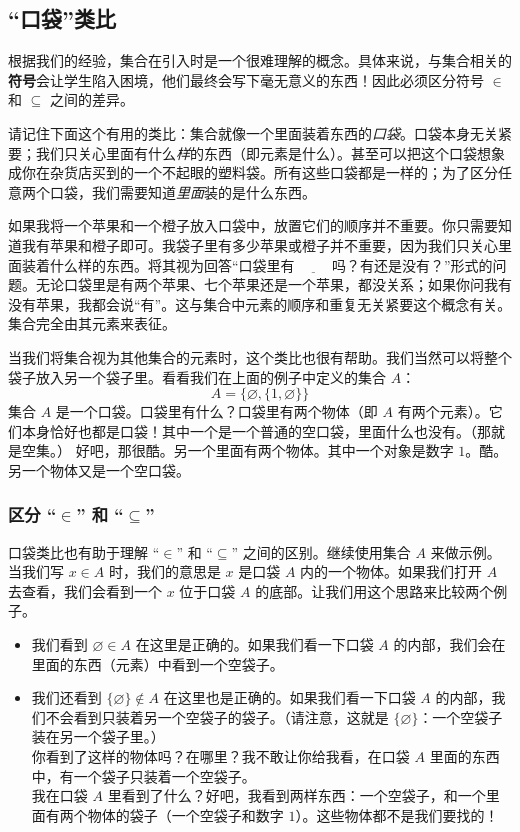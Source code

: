 \subsection{``口袋''类比}\label{sec:section3.4.4}

根据我们的经验，集合在引入时是一个很难理解的概念。具体来说，与集合相关的\textbf{符号}会让学生陷入困境，他们最终会写下毫无意义的东西！因此必须区分符号 $\in$ 和 $\subseteq$ 之间的差异。

请记住下面这个有用的类比：集合就像一个里面装着东西的\textit{口袋}。口袋本身无关紧要；我们只关心里面有什么\textit{样}的东西（即元素是什么）。甚至可以把这个口袋想象成你在杂货店买到的一个不起眼的塑料袋。所有这些口袋都是一样的；为了区分任意两个口袋，我们需要知道\textit{里面}装的是什么东西。

如果我将一个苹果和一个橙子放入口袋中，放置它们的顺序并不重要。你只需要知道我有苹果和橙子即可。我袋子里有多少苹果或橙子并不重要，因为我们只关心里面装着什么样的东西。将其视为回答``口袋里有 $\underline{\qquad}$ 吗？有还是没有？''形式的问题。无论口袋里是有两个苹果、七个苹果还是一个苹果，都没关系；如果你问我有没有苹果，我都会说``有''。这与集合中元素的顺序和重复无关紧要这个概念有关。集合完全由其元素来表征。

当我们将集合视为其他集合的元素时，这个类比也很有帮助。我们当然可以将整个袋子放入另一个袋子里。看看我们在上面的例子中定义的集合 $A$：
\[A = \{\varnothing, \{1, \varnothing\}\}\]
集合 $A$ 是一个口袋。口袋里有什么？口袋里有两个物体（即 $A$ 有两个元素）。它们本身恰好也都是口袋！其中一个是一个普通的空口袋，里面什么也没有。（那就是空集。） 好吧，那很酷。另一个里面有两个物体。其中一个对象是数字 $1$。酷。另一个物体又是一个空口袋。

\subsubsection*{区分 ``$\in$'' 和 ``$\subseteq$''}

口袋类比也有助于理解 ``$\in$'' 和 ``$\subseteq$'' 之间的区别。继续使用集合 $A$ 来做示例。当我们写 $x \in A$ 时，我们的意思是 $x$ 是口袋 $A$ 内的一个物体。如果我们打开 $A$ 去查看，我们会看到一个 $x$ 位于口袋 $A$ 的底部。让我们用这个思路来比较两个例子。

\begin{itemize}
    \item 我们看到 $\varnothing \in A$ 在这里是正确的。如果我们看一下口袋 $A$ 的内部，我们会在里面的东西（元素）中看到一个空袋子。
    \item 我们还看到 $\{\varnothing\} \notin A$ 在这里也是正确的。如果我们看一下口袋 $A$ 的内部，我们不会看到只装着另一个空袋子的袋子。（请注意，这就是 $\{\varnothing\}$：一个空袋子装在另一个袋子里。）\\
    你看到了这样的物体吗？在哪里？我不敢让你给我看，在口袋 $A$ 里面的东西中，有一个袋子只装着一个空袋子。\\
    我在口袋 $A$ 里看到了什么？好吧，我看到两样东西：一个空袋子，和一个里面有两个物体的袋子（一个空袋子和数字 $1$）。这些物体都不是我们要找的！
\end{itemize}

